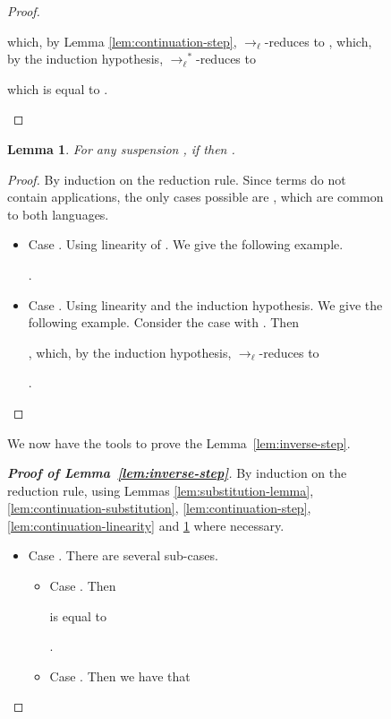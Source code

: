 \documentclass{LMCS}
\newtheorem{lemma}[theorem]{Lemma}
\newcommand{\xto}[1]{\ensuremath{\rightarrow_{#1}}}
\newcommand{\tolinred}{\xto{\ell}}
\newcommand{\stolinred}{\ensuremath{\xto{\ell}^{\ast}}}
\begin{document}
\begin{figure}
{\begin{proof}
\begin{itemize}
      which, by Lemma \ref{lem:continuation-step}, \tolinred-reduces to
      ,
      which, by the induction hypothesis, \stolinred-reduces to
      
      which is equal to
      .
      \qedhere
  \end{itemize}
\end{proof}

\begin{lemma}\label{lem:suspension-step}
  For any suspension , if 
  then .
\end{lemma}
\begin{proof}
  By induction on the reduction rule. Since  terms do not contain
  applications, the only cases possible are , which are common
  to both languages.
  \begin{itemize}
    \item Case . Using linearity of . We give the following example.
      
      
      
      .

    \item Case . Using linearity and the induction hypothesis. We give
      the following example. Consider the case 
      with . Then 
      
      ,
      which, by the induction hypothesis, \tolinred-reduces to
      
      .
      \qedhere
  \end{itemize}
\end{proof}

We now have the tools to prove the Lemma~\ref{lem:inverse-step}.

\begin{proof}[\bf Proof of Lemma~\ref{lem:inverse-step}]
  By induction on the reduction rule, using Lemmas \ref{lem:substitution-lemma},
  \ref{lem:continuation-substitution}, \ref{lem:continuation-step},
  \ref{lem:continuation-linearity} and \ref{lem:suspension-step} where
  necessary.
  \begin{itemize}
    \item Case . There are several sub-cases.
      \begin{itemize}
	\item Case . Then 
	  
	  is equal to
	  
	  
	  .

	\item Case . Then we have that
	  
	  
	  

\end{itemize}
\end{itemize}
\end{proof}}
\end{figure}
\end{document}
